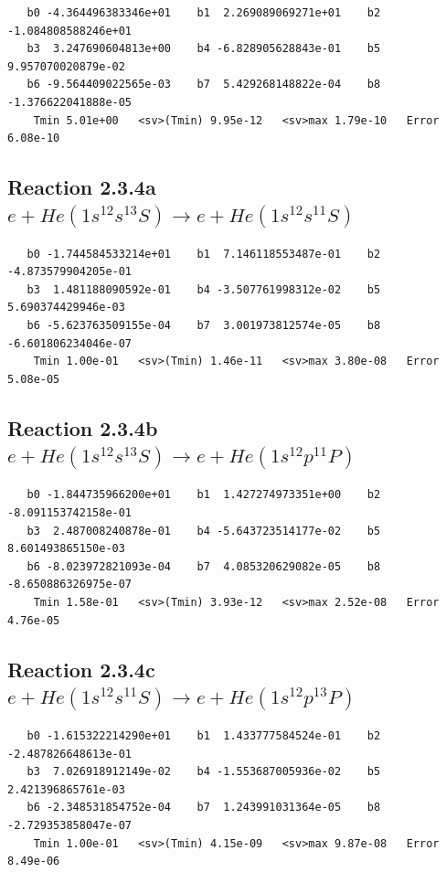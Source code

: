 \documentclass[12pt,dvipdfmx]{article}
\begin{document}
\begin{small}\begin{verbatim}
   b0 -4.364496383346e+01    b1  2.269089069271e+01    b2 -1.084808588246e+01
   b3  3.247690604813e+00    b4 -6.828905628843e-01    b5  9.957070020879e-02
   b6 -9.564409022565e-03    b7  5.429268148822e-04    b8 -1.376622041888e-05
    Tmin 5.01e+00   <sv>(Tmin) 9.95e-12   <sv>max 1.79e-10   Error 6.08e-10
\end{verbatim}\end{small}

\newpage
\subsection{
Reaction 2.3.4a $  e + He(1s^12s^13S) \rightarrow e + He(1s^12s^11S)$}


\begin{small}\begin{verbatim}
   b0 -1.744584533214e+01    b1  7.146118553487e-01    b2 -4.873579904205e-01
   b3  1.481188090592e-01    b4 -3.507761998312e-02    b5  5.690374429946e-03
   b6 -5.623763509155e-04    b7  3.001973812574e-05    b8 -6.601806234046e-07
    Tmin 1.00e-01   <sv>(Tmin) 1.46e-11   <sv>max 3.80e-08   Error 5.08e-05
\end{verbatim}\end{small}

\newpage
\subsection{
Reaction 2.3.4b $  e + He(1s^12s^13S) \rightarrow e + He(1s^12p^11P)$}


\begin{small}\begin{verbatim}
   b0 -1.844735966200e+01    b1  1.427274973351e+00    b2 -8.091153742158e-01
   b3  2.487008240878e-01    b4 -5.643723514177e-02    b5  8.601493865150e-03
   b6 -8.023972821093e-04    b7  4.085320629082e-05    b8 -8.650886326975e-07
    Tmin 1.58e-01   <sv>(Tmin) 3.93e-12   <sv>max 2.52e-08   Error 4.76e-05
\end{verbatim}\end{small}

\newpage
\subsection{
Reaction 2.3.4c $  e + He(1s^12s^11S) \rightarrow e + He(1s^12p^13P)$}


\begin{small}\begin{verbatim}
   b0 -1.615322214290e+01    b1  1.433777584524e-01    b2 -2.487826648613e-01
   b3  7.026918912149e-02    b4 -1.553687005936e-02    b5  2.421396865761e-03
   b6 -2.348531854752e-04    b7  1.243991031364e-05    b8 -2.729353858047e-07
    Tmin 1.00e-01   <sv>(Tmin) 4.15e-09   <sv>max 9.87e-08   Error 8.49e-06
\end{verbatim}\end{small}
\end{document}

